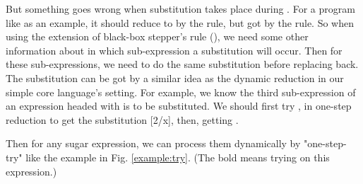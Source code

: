 \todo{}
But something goes wrong when substitution takes place during . For a program like  as an example, it should reduce to  by the  rule, but got  by the  rule. So when using the extension of black-box stepper's rule (), we need some other information about in which sub-expression a substitution will occur. Then for these sub-expressions, we need to do the same substitution before replacing back. The substitution can be got by a similar idea as the dynamic reduction in our simple core language's setting. For example, we know the third sub-expression of an expression headed with  is to be substituted. We should first try ,  in one-step reduction to get the substitution [2/x], then, getting .

Then for any sugar expression, we can process them dynamically by "one-step-try" like the example in Fig.  \ref{example:try}. (The bold  means trying on this expression.)

